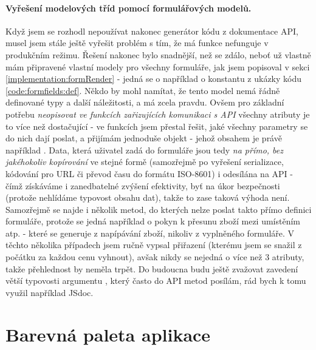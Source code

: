 \paragraph{Vyřešení modelových tříd pomocí formulářových modelů.} Když jsem se rozhodl nepoužívat nakonec generátor kódu z dokumentace API, musel jsem stále ještě vyřešit problém s tím, že má funkce  nefunguje v produkčním režimu. Řešení nakonec bylo snadnější, než se zdálo, neboť už vlastně mám připravené vlastní modely pro všechny formuláře, jak jsem popisoval v sekci \ref{implementation:formRender} - jedná se o například o konstantu  z ukázky kódu \ref{code:formfields:def}. Někdo by mohl namítat, že tento model nemá řádně definované typy a další náležitosti, a má zcela pravdu. Ovšem pro základní potřebu \emph{neopisovat ve funkcích zařizujících komunikaci s API} všechny atributy je to více než dostačující - ve funkcích jsem přestal řešit, jaké všechny parametry se do nich dají poslat, a přijímám jednoduše objekt  - jehož obsahem je právě například . Data, která uživatel zadá do formuláře jsou tedy \emph{na přímo, bez jakéhokoliv kopírování} ve stejné formě (samozřejmě po vyřešení serializace, kódování pro URL či převod času do formátu ISO-8601) i odesílána na API - čímž získáváme i zanedbatelné zvýšení efektivity, byť na úkor bezpečnosti (protože nehlídáme typovost obsahu dat), takže to zase taková výhoda není.\\
Samozřejmě se najde i několik metod, do kterých nelze poslat takto přímo definici formuláře, protože se jedná například o pokyn k přesunu zboží mezi umístěním atp. - které se generuje z napípávání zboží, nikoliv z vyplněného formuláře. V těchto několika případech jsem ručně vypsal přiřazení (kterému jsem se snažil z počátku za každou cenu vyhnout), avšak nikdy se nejedná o více než 3 atributy, takže přehlednost by neměla trpět.
Do budoucna budu ještě zvažovat zavedení větší typovosti argumentu , který často do API metod posílám, rád bych k tomu využil například JSdoc.


\section{Barevná paleta aplikace}\label{implementation:colors:idempotent}

